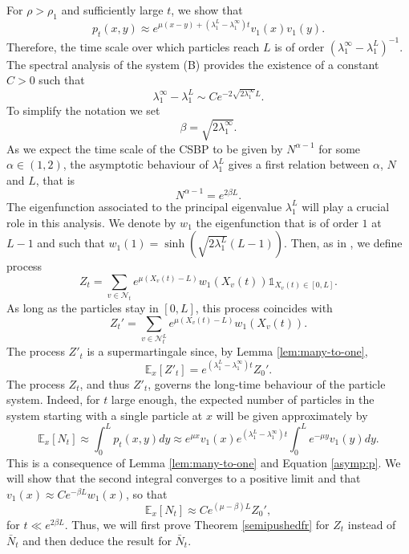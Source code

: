 \documentclass[11pt]{article}
\theoremstyle{plain}
\newcommand\linf{\lambda_1^\infty}
\begin{document}
For $\rho>\rho_1$ and sufficiently large $t$, we show that
\begin{equation}\label{asymp:p}
p_t(x,y) \approx e^{\mu(x-y) + (\lambda_1^L - \linf)t} v_1(x)v_1(y).
\end{equation}
Therefore, the time scale over which particles reach $L$ is of order $(\linf-\lambda_1^L)^{-1}.$ The spectral analysis of the system (B) provides the existence of a constant $C>0$ such that 
\begin{equation*}
\linf-\lambda_1^L\sim Ce^{-2\sqrt{2\linf} L}.
\end{equation*}
To simplify the notation we set 
\begin{equation}
\beta=\sqrt{2\linf}.\label{def:beta}
\end{equation}
As we expect the time scale of the CSBP to be given by $N^{\alpha-1}$ for some $\alpha\in(1,2)$, the asymptotic behaviour of $\lambda_1^L$ gives a first relation between $\alpha$, $N$ and $L$, that is
\begin{equation*}
N^{\alpha-1}= e^{2\beta L}.
\end{equation*}
 The eigenfunction associated to the principal eigenvalue $\lambda_1^L$  will play a crucial role in this analysis. We  denote by $w_1$ the eigenfunction that is of order $1$ at $L-1$ and such that $w_1(1)=\sinh(\sqrt{2\lambda_1^L}(L-1))$. Then,  as in \cite{Berestycki2010}, we define  process
\[
Z_t = \sum_{v\in\mathcal N_t} e^{\mu (X_v(t)-L)} w_1(X_v(t))\mathbb{1}_{X_v(t)\in[0,L]}.
\]
As long as the particles stay in $[0,L]$, this process coincides with
$$Z_t' = \sum_{v\in\mathcal N_t^L} e^{\mu (X_v(t)-L)} w_1(X_v(t)).$$ 
The process $Z'_t$ is a supermartingale since, by  Lemma \ref{lem:many-to-one}, 
\begin{equation}
\mathbb{E}_x\left[Z'_t\right]=e^{(\lambda_1^L-\linf)t}Z_0'.\label{eq:intr:fmZ}
\end{equation}
The process $Z_t$, and thus $Z'_t$, governs the long-time behaviour of the particle system. Indeed, for $t$ large enough, the expected number of particles in the system starting with a single particle at $x$ will be   given approximately by 
\begin{equation*}
\mathbb{E}_x\left[N_t\right] \approx\int_0^L p_t(x,y)dy\approx e^{\mu x}v_1(x)e^{(\lambda_1^L-\linf)t}\int_0^Le^{-\mu y}v_1(y)dy.
\end{equation*}
This is a consequence of Lemma \ref{lem:many-to-one} and Equation \eqref{asymp:p}.
We will show that the second integral converges to a positive limit and that $v_1(x)\approx Ce^{-\beta L}w_1(x)$, so that 
\begin{equation}
\mathbb{E}_x\left[N_t\right] \approx Ce^{(\mu-\beta)L}Z_0', \label{eq:NZ}
\end{equation}
for $t\ll e^{2\beta L}$. Thus, we will first prove  Theorem \ref{semipushedfr} for $Z_t$ instead of $\bar{N}_t$ and then deduce the result for $\bar{N}_t$. 
\end{document}
